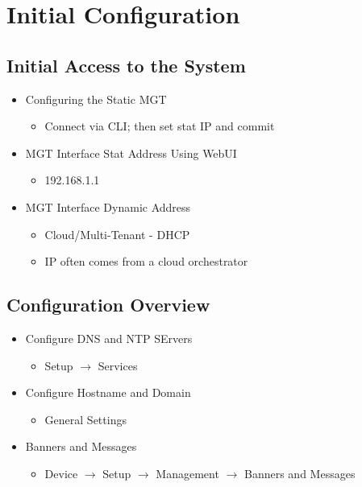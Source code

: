 \section{Initial Configuration}

\subsection{Initial Access to the System}
    \begin{itemize}
        \item Configuring the Static MGT
            \begin{itemize}
                \item Connect via CLI; then set stat IP and commit
            \end{itemize}
        \item MGT Interface Stat Address Using WebUI
            \begin{itemize}
                \item 192.168.1.1
            \end{itemize}
        \item MGT Interface Dynamic Address
            \begin{itemize}
                \item Cloud/Multi-Tenant - DHCP
                \item IP often comes from a cloud orchestrator 
            \end{itemize}
    \end{itemize}

\subsection{Configuration Overview}
    \begin{itemize}
        \item Configure DNS and NTP SErvers
            \begin{itemize}
                \item Setup $\rightarrow$ Services
            \end{itemize}
        \item Configure Hostname and Domain
            \begin{itemize}
                \item General Settings
            \end{itemize}
        \item Banners and Messages
            \begin{itemize}
                \item Device $\rightarrow$ Setup $\rightarrow$ Management $\rightarrow$ Banners and Messages
            \end{itemize}
    \end{itemize}


